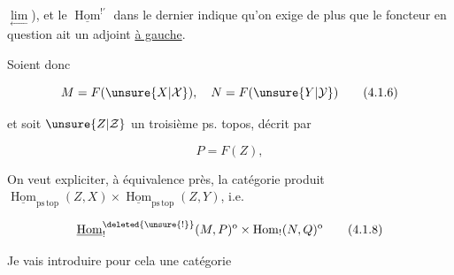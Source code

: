
$\underset{\longleftarrow}{\lim}$), et  le $\underline{\operatorname{Hom}}^{!'}$ dans le dernier  indique qu'on exige de plus que le foncteur en question ait un adjoint \uline{à gauche}.

Soient donc 

\[
M=F(\unsure{X|\mathcal X}),\quad N=F(\unsure{Y|\mathcal Y})
\tag*{(4.1.6)}
\]

et soit $\unsure{Z|\mathcal Z}$ un troisième ps. topos, décrit par

\[
P=F(Z),
\tag*{(4.1.7)}
\]

On veut expliciter, à équivalence près, la catégorie produit $\underline{\operatorname{Hom}}_{\mathrm{ps\,top}}(Z,X)\times\underline{\operatorname{Hom}}_{\mathrm{ps\,top}}(Z,Y)$, i.e.

\[
\underline{\operatorname{Hom}}_{!}^{\deleted{\unsure{!}}}(M,P)^{\mathrm{o}}
\times\operatorname{Hom}_{!}(N,Q)^{\mathrm{o}}
\tag*{(4.1.8)}
\]




\deleted{\[
(f^{*}\boxtimes g^{*})(x,y)=
\underbrace{\unsure{g^{*}|f^{*}}(\unsure{a|x})\times f^{\unsure{*|\alpha}}(y)}_{\substack{\text{produit cartésien}\\\text{dans }P}}
\tag*{(4.1.10)}
\]}

Je vais introduire pour cela une catégorie
